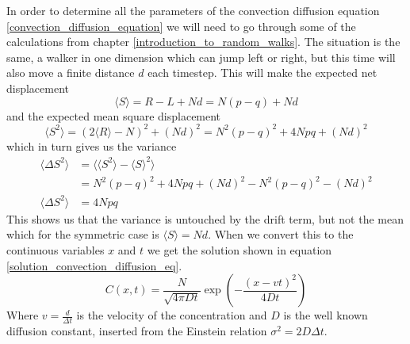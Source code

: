 In order to determine all the parameters of the convection diffusion equation \eqref{convection_diffusion_equation} we will need to go through some of the calculations from chapter \ref{introduction_to_random_walks}. 
The situation is the same, a walker in one dimension which can jump left or right, but this time will also move a finite distance $d$ each timestep. 
This will make the expected net displacement
\begin{equation*}
 \langle S\rangle = R-L +Nd = N(p-q) + Nd
\end{equation*}
and the expected mean square displacement
\begin{equation*}
 \langle S^2\rangle = (2\langle R\rangle -N)^2 +(Nd)^2 = N^2(p-q)^2 +4Npq +(Nd)^2
\end{equation*}
which in turn gives us the variance
\begin{align*}
 \langle \Delta S^2\rangle &= \langle\langle S^2\rangle-\langle S\rangle^2\rangle \\
 &= N^2(p-q)^2 +4Npq +(Nd)^2 - N^2(p-q)^2 -(Nd)^2 \\
\langle \Delta S^2\rangle &= 4Npq
\end{align*}
This shows us that the variance is untouched by the drift term, but not the mean which for the symmetric case is $\langle S\rangle = Nd$. 
When we convert this to the continuous variables $x$ and $t$ we get the solution shown in equation \ref{solution_convection_diffusion_eq}.
\begin{equation}\label{solution_convection_diffusion_eq}
 C(x,t) = \frac{N}{\sqrt{4\pi Dt}}\exp\left(-\frac{(x-vt)^2}{4Dt}\right)
\end{equation}
Where $v = \frac{d}{\Delta t}$ is the velocity of the concentration and $D$ is the well known diffusion constant, inserted from the Einstein relation $\sigma^2 = 2D\Delta t$.\\


